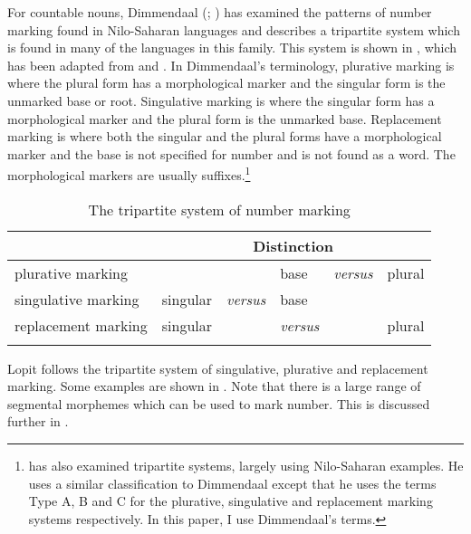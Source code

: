 \documentclass[output=paper]{langsci/langscibook}
\begin{document}
For countable nouns, Dimmendaal (\citeyear[224]{Dimmendaal1983}; \citeyear[214]{Dimmendaal2000}) has examined the patterns of number marking found in Nilo-Saharan languages and describes a tripartite system which is found in many of the languages in this family. This system is shown in , which has been adapted from \citet[224]{Dimmendaal1983} and \citet[156]{Corbett2000}. In Dimmendaal’s terminology, plurative marking is where the plural form has a morphological marker and the singular form is the unmarked base or root. Singulative marking is where the singular form has a morphological marker and the plural form is the unmarked base. Replacement marking is where both the singular and the plural forms have a morphological marker and the base is not specified for number and is not found as a word. The morphological markers are usually suffixes.\footnote{\citet[156]{Corbett2000} has also examined tripartite systems, largely using Nilo-Saharan examples. He uses a similar classification to Dimmendaal except that he uses the terms Type A, B and C for the plurative, singulative and replacement marking systems respectively. In this paper, I use Dimmendaal’s terms.}

\begin{table}
\begin{tabularx}{\textwidth}{lXXXXX}
\lsptoprule
\multicolumn{1}{c}{\textbf{System}} & \multicolumn{5}{c}{\textbf{Distinction}}\\
\midrule
plurative marking &  &  & base & \itshape versus & plural\\
singulative marking & singular & \itshape versus & base &  & \\
replacement marking & singular &  & \itshape versus &  & plural\\
\lspbottomrule
\end{tabularx}
\caption{The tripartite system of number marking}
\label{tab:moodie:1}
\end{table}

Lopit follows the tripartite system of singulative, plurative and replacement marking. Some examples are shown in . Note that there is a large range of segmental morphemes which can be used to mark number. This is discussed further in .
\end{document}
